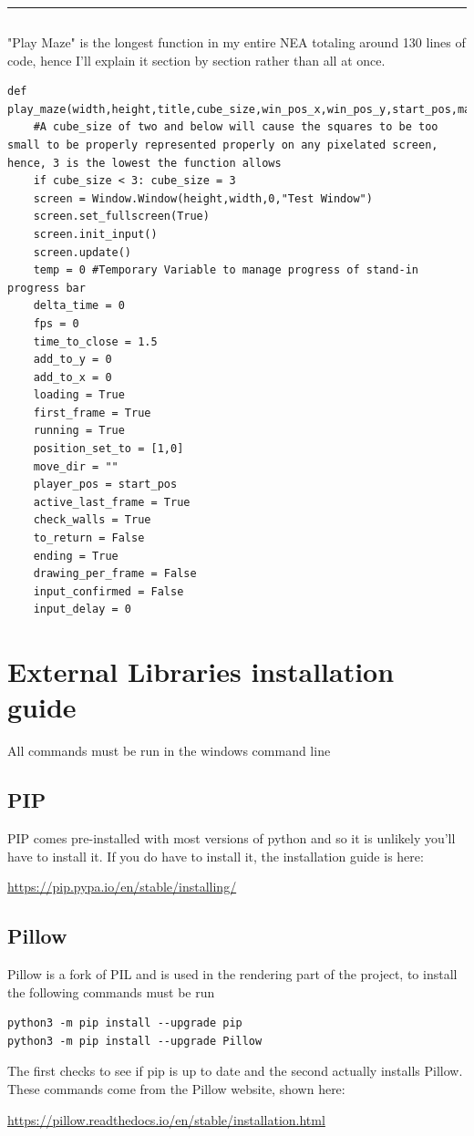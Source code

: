 \documentclass{article}
\begin{document}
\textcolor[RGB]{220,220,220}{\rule{\linewidth}{0.2pt}}
\begin{lstlisting}
\end{lstlisting}
"Play Maze" is the longest function in my entire NEA totaling around 130 lines of code, hence I'll explain it section by section rather than all at once.
\begin{lstlisting}
def play_maze(width,height,title,cube_size,win_pos_x,win_pos_y,start_pos,maze_data):
    #A cube_size of two and below will cause the squares to be too small to be properly represented properly on any pixelated screen, hence, 3 is the lowest the function allows
    if cube_size < 3: cube_size = 3 
    screen = Window.Window(height,width,0,"Test Window")
    screen.set_fullscreen(True)
    screen.init_input()
    screen.update()
    temp = 0 #Temporary Variable to manage progress of stand-in progress bar
    delta_time = 0
    fps = 0
    time_to_close = 1.5
    add_to_y = 0
    add_to_x = 0
    loading = True
    first_frame = True
    running = True
    position_set_to = [1,0]
    move_dir = ""
    player_pos = start_pos
    active_last_frame = True
    check_walls = True
    to_return = False
    ending = True
    drawing_per_frame = False
    input_confirmed = False
    input_delay = 0
\end{lstlisting}



\clearpage
\section{External Libraries installation guide}
All commands must be run in the windows command line
\subsection{PIP}
PIP comes pre-installed with most versions of python and so it is unlikely you'll have to install it. If you do have to install it, the installation guide is here: 
\begin{center}
\url{https://pip.pypa.io/en/stable/installing/}
\end{center}
\subsection{Pillow}
Pillow is a fork of PIL and is used in the rendering part of the project, to install the following commands must be run
\begin{lstlisting}
python3 -m pip install --upgrade pip
python3 -m pip install --upgrade Pillow
\end{lstlisting}
The first checks to see if pip is up to date and the second actually installs Pillow. These commands come from the Pillow website, shown here:
\begin{center}
\url{https://pillow.readthedocs.io/en/stable/installation.html}
\end{center}
\end{document}
